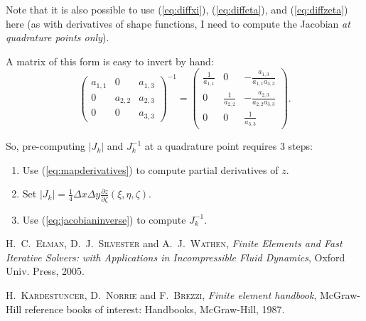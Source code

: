 \documentclass{article}
\begin{document}
Note that it is also possible to use (\ref{eq:diffxi}), (\ref{eq:diffeta}), and (\ref{eq:diffzeta}) here (as with derivatives of shape functions, I need to compute the Jacobian \emph{at quadrature points only}).

A matrix of this form is easy to invert by hand:
\begin{equation}
  \left(\begin{array}{lll}
    a_{1, 1} & 0 & a_{1, 3}\\
    0 & a_{2, 2} & a_{2, 3}\\
    0 & 0 & a_{3, 3}
  \end{array} \right)^{- 1} = \left(\begin{array}{ccc}
    \frac{1}{a_{1, 1}} & 0 & - \frac{a_{1, 3}}{a_{1, 1} a_{3, 3}}\\
    0 & \frac{1}{a_{2, 2}} & - \frac{a_{2, 3}}{a_{2, 2} a_{3, 3}}\\
    0 & 0 & \frac{1}{a_{3, 3}}
  \end{array} \right) . \label{eq:jacobianinverse}
\end{equation}


So, pre-computing $| J_k |$ and $J^{-1}_k$ at a quadrature point requires $3$
steps:
\begin{enumerate}
  \item Use (\ref{eq:mapderivatives}) to compute partial derivatives of $z$.

  \item Set $| J_k | = \frac{1}{4} \Delta x \Delta y \frac{\partial
  z}{\partial \zeta} (\xi, \eta, \zeta)$.

  \item Use (\ref{eq:jacobianinverse}) to compute $J_k^{- 1}$.
\end{enumerate}


\begin{thebibliography}{1}
  \textsc{H.~C.~Elman}, \textsc{D.~J.~Silvester}
  and \textsc{A.~J.~Wathen}, \textit{Finite Elements and Fast Iterative
  Solvers: with Applications in Incompressible Fluid Dynamics}, Oxford Univ.
  Press, 2005.{\newblock}

  \textsc{H.~Kardestuncer},
  \textsc{D.~Norrie} and \textsc{F.~Brezzi}, \textit{Finite element
  handbook}, McGraw-Hill reference books of interest: Handbooks, McGraw-Hill,
  1987.{\newblock}
\end{thebibliography}
\end{document}
